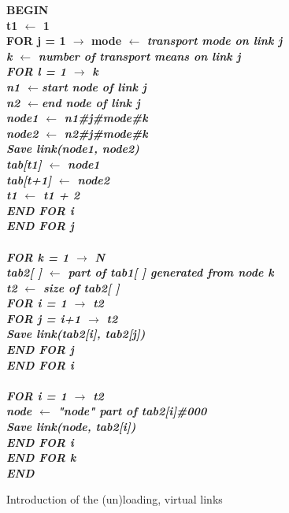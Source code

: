 \begin{center}
\begin{figure}[htbp]
{\begin{minipage}{20cm}
\begin{tabbing}
\bf {BEGIN}\\
t1 $\leftarrow$ 1\\
\bf {FOR} j = 1 $\rightarrow$ mode $\leftarrow$ \it{transport mode on link j}\\
\> k $\leftarrow$ \it {number of transport means on link j}\\
\> \bf {FOR} l = 1 $\rightarrow$ k\\
\> \>  n1 $\leftarrow$\it {start node of link j}\\
\> \> n2 $\leftarrow$\it {end node of link j}\\
\> \> node1 $\leftarrow$ n1\#j\#mode\#k\\
\> \>  node2 $\leftarrow$ n2\#j\#mode\#k\\
\> \>  \it { Save link(node1, node2)}\\
\> \> tab[t1] $\leftarrow$ node1\\
\> \>  tab[t+1] $\leftarrow$ node2\\
\> \> t1 $\leftarrow$ t1 + 2\\
\>  \bf {END FOR} i\\
\bf {END FOR} j\\
\\
\bf {FOR} k = 1 $\rightarrow$ N\\
\> tab2[ ] $\leftarrow$ \it{part of tab1[ ] generated from node k}\\
\> t2 $\leftarrow$ \it {size of tab2[ ]}\\
\> \bf{FOR}  i = 1 $\rightarrow$ t2\\
\> \> \bf{FOR} j = i+1 $\rightarrow$ t2\\
\> \> \> \it{Save link(tab2[i], tab2[j])}\\
\> \> \bf{END FOR} j\\
\> \bf {END FOR} i\\
\\
\> \bf{FOR} i = 1 $\rightarrow$ t2\\
\> \> node $\leftarrow$ \it{"node" part of tab2[i]\#000}\\
\> \> \it{Save link(node, tab2[i])}\\
\> \bf{END FOR} i\\
\bf {END FOR} k\\
\bf {END}\\
\end{tabbing}
\end{minipage}
}
\caption{\label{algo2} Introduction of the (un)loading, virtual links}
\end{figure}
\end{center}




